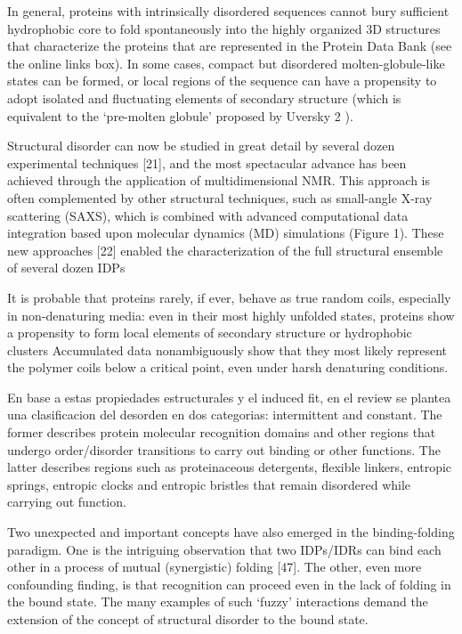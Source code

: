 In general, proteins with intrinsically disordered sequences cannot bury sufficient hydrophobic core to fold spontaneously into the highly organized 3D structures that characterize the proteins that are represented in the Protein Data Bank (see the online links
box). In some cases, compact but disordered molten-globule-like states can be formed, or local regions of the sequence can have a propensity to adopt isolated and fluctuating elements of secondary structure (which is equivalent to the ‘pre-molten globule’ proposed by Uversky 2 ). 

Structural disorder can now be studied in great detail by several dozen experimental techniques [21], and the most spectacular advance has been achieved through the application of multidimensional NMR. This approach is often
complemented by other structural techniques, such as small-angle X-ray scattering (SAXS), which is combined with advanced computational data integration based upon molecular dynamics (MD) simulations (Figure 1). These new
approaches [22] enabled the characterization of the full structural ensemble of several dozen IDPs

It is probable that proteins rarely, if ever, behave as true random coils, especially in non-denaturing media: even in their most highly unfolded states, proteins show a propensity to form local elements of secondary structure or hydrophobic clusters
Accumulated data nonambiguously show that they most likely represent the polymer coils below a critical point, even under harsh denaturing conditions.




En base a estas propiedades estructurales y el induced fit, en el review \cite{dunker2001intrinsically} se plantea una clasificacion del desorden en dos categorias: intermittent and constant.
The former describes protein molecular recognition domains and other regions that undergo order/disorder transitions to carry out binding or other functions. The latter describes regions such as
proteinaceous detergents, flexible linkers, entropic springs, entropic clocks and entropic bristles that remain disordered while carrying out function.

Two unexpected and important concepts have also emerged in the binding-folding paradigm. One is the intriguing observation that two IDPs/IDRs can bind each other in a process of mutual (synergistic) folding [47].
The other, even more confounding finding, is that recognition can proceed even in the lack of folding in the bound state. 
The many examples of such ‘fuzzy’ interactions demand the extension of the concept of structural disorder to the bound state.



